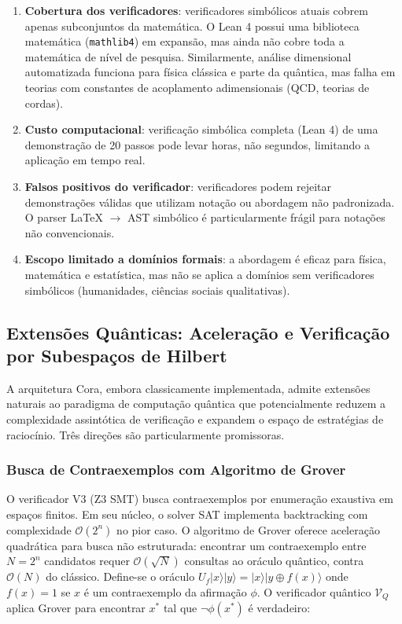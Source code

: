 \documentclass[5p]{elsarticle}
\theoremstyle{remark}
\begin{document}
\begin{enumerate}[label=(\alph*)]
    \item \textbf{Cobertura dos verificadores}: verificadores simbólicos atuais cobrem apenas subconjuntos da matemática. O Lean 4 possui uma biblioteca matemática (\texttt{mathlib4}) em expansão, mas ainda não cobre toda a matemática de nível de pesquisa. Similarmente, análise dimensional automatizada funciona para física clássica e parte da quântica, mas falha em teorias com constantes de acoplamento adimensionais (QCD, teorias de cordas).

    \item \textbf{Custo computacional}: verificação simbólica completa (Lean 4) de uma demonstração de 20 passos pode levar horas, não segundos, limitando a aplicação em tempo real.

    \item \textbf{Falsos positivos do verificador}: verificadores podem rejeitar demonstrações válidas que utilizam notação ou abordagem não padronizada. O parser LaTeX $\to$ AST simbólico é particularmente frágil para notações não convencionais.

    \item \textbf{Escopo limitado a domínios formais}: a abordagem é eficaz para física, matemática e estatística, mas não se aplica a domínios sem verificadores simbólicos (humanidades, ciências sociais qualitativas).
\end{enumerate}

\subsection{Extensões Quânticas: Aceleração e Verificação por Subespaços de Hilbert}

A arquitetura Cora, embora classicamente implementada, admite extensões naturais ao paradigma de computação quântica que potencialmente reduzem a complexidade assintótica de verificação e expandem o espaço de estratégias de raciocínio. Três direções são particularmente promissoras.

\subsubsection{Busca de Contraexemplos com Algoritmo de Grover}

O verificador V3 (Z3 SMT) busca contraexemplos por enumeração exaustiva em espaços finitos. Em seu núcleo, o solver SAT implementa backtracking com complexidade $\mathcal{O}(2^n)$ no pior caso. O algoritmo de Grover \cite{Grover1996Quantum} oferece aceleração quadrática para busca não estruturada: encontrar um contraexemplo entre $N = 2^n$ candidatos requer $\mathcal{O}(\sqrt{N})$ consultas ao oráculo quântico, contra $\mathcal{O}(N)$ do clássico. Define-se o oráculo $U_f |x\rangle|y\rangle = |x\rangle|y \oplus f(x)\rangle$ onde $f(x) = 1$ se $x$ é um contraexemplo da afirmação $\phi$. O verificador quântico $\mathcal{V}_Q$ aplica Grover para encontrar $x^*$ tal que $\neg\phi(x^*)$ é verdadeiro:
\end{document}
